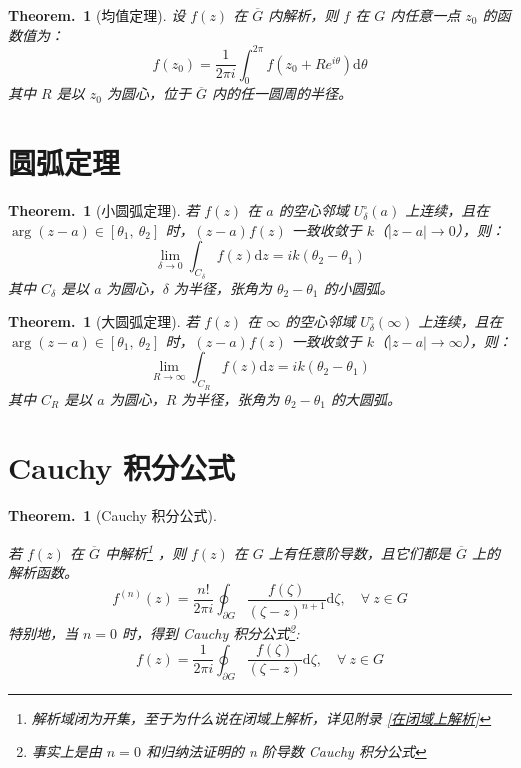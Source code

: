 \documentclass[UTF8]{report}
\theoremstyle{MyLineTheoremStyle} %
\theoremstyle{MyBlockTheoremStyle} %
\newtheorem{BlockTheorem}[LineTheorem]{Theorem.\,} %
\theoremstyle{MySubsubsectionStyle} %
\begin{document}
\begin{BlockTheorem}[均值定理]\label{均值定理}
设 $f(z)$ 在 $\overline{G}$ 内解析，则 $f$ 在 $G$ 内任意一点 $z_0$ 的函数值为：
\begin{equation}
f(z_0) = \frac{1}{2\pi i} \int_{0}^{2\pi} f(z_0 + R e^{i\theta}) \mathrm{d}\theta
\end{equation} 
其中 $R$ 是以 $z_0$ 为圆心，位于 $\overline{G}$ 内的任一圆周的半径。
\end{BlockTheorem}




\section{圆弧定理}
\begin{BlockTheorem}[小圆弧定理]\label{小圆弧定理}
若 $f(z)$ 在 $a$ 的空心邻域 $U_{\delta}^\circ(a)$ 上连续，且在 $\arg (z - a) \in [\theta_1,\ \theta_2]$ 时，$(z-a)f(z)$ 一致收敛于 $k$（$| z -a |\to 0$），则：
\begin{equation}
\lim_{\delta \to 0} \int_{C_\delta} f(z)\mathrm{d}z = ik(\theta_2 - \theta_1)
\end{equation}
其中 $C_\delta$ 是以 $a$ 为圆心，$\delta$ 为半径，张角为 $\theta_2 - \theta_1$ 的小圆弧。
\end{BlockTheorem}

\begin{BlockTheorem}[大圆弧定理]\label{大圆弧定理}
    若 $f(z)$ 在 $\infty$ 的空心邻域 $U_{\delta}^\circ(\infty)$ 上连续，且在 $\arg (z - a) \in [\theta_1,\ \theta_2]$ 时，$(z-a)f(z)$ 一致收敛于 $k$（$| z - a| \to \infty$），则：
    \begin{equation}
    \lim_{R \to \infty} \int_{C_R} f(z)\mathrm{d}z = ik(\theta_2 - \theta_1)
    \end{equation}
    其中 $C_R$ 是以 $a$ 为圆心，$R$ 为半径，张角为 $\theta_2 - \theta_1$ 的大圆弧。
    \end{BlockTheorem}

\section{Cauchy 积分公式}

\begin{BlockTheorem}[Cauchy 积分公式]\label{n 阶导数 Cauchy 积分公式}


若 $f(z)$ 在 $\overline{G} $ 中解析\footnote{解析域闭为开集，至于为什么说在闭域上解析，详见附录 \ref{在闭域上解析}} ，则 $f(z)$ 在 $G$ 上有任意阶导数，且它们都是 $\overline{G} $ 上的解析函数。
\begin{equation}
f^{(n)}(z) = \frac{n !}{2\pi i}\oint_{\partial G} \frac{f(\zeta)}{(\zeta - z)^{n+1}} \mathrm{d} \zeta,\quad \forall\ z \in G
\end{equation} 
特别地，当 $n = 0$ 时，得到 Cauchy 积分公式\footnote{事实上是由 $n = 0$ 和归纳法证明的 n 阶导数 Cauchy 积分公式}: 
\begin{equation}
    f(z) = \frac{1}{2\pi i}\oint_{\partial G} \frac{f(\zeta)}{(\zeta - z)} \mathrm{d} \zeta,\quad \forall\ z \in G
\end{equation}

\end{BlockTheorem}
\end{document}
